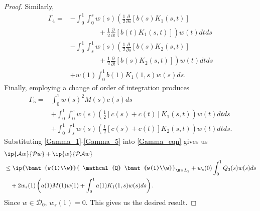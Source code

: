 \documentclass[9pt,journal,twocolumn]{IEEEtran}
\newcommand{\pfs}{\frac{\partial}{\partial s}}
\newcommand{\igzo}{\int_0^1}
\newcommand{\igzs}{\int_0^s}
\newcommand{\igso}{\int_s^1}
\newcommand{\hlf}{\frac{1}{2}}
\begin{document}
\begin{proof}
 Similarly,
 \begin{align}
 \Gamma_4 =&- \igzo \igzs w(s) \left(\hlf \pfs \left[b(s)K_1(s,t)\right] \right. \nonumber \\
 &\left. \qquad \qquad + \hlf \frac{\partial}{\partial t}\left[ b(t)K_1(s,t)\right] \right) w(t) d t ds  \nonumber \\
 & - \igzo \igso w(s) \left(\hlf \pfs \left[b(s)K_2(s,t) \right] \right. \nonumber \\
 & \left. \qquad \qquad + \hlf \frac{\partial}{\partial t} \left[b(s)K_2(s,t) \right] \right) w(t) d t ds \nonumber \\
 & \label{Gamma_4} + w(1) \igzo b(1)K_1(1,s)w(s)ds.
 \end{align} 
Finally, employing a change of order of integration produces
 \begin{align}
 \Gamma_5 = & \igzo w(s)^2 M(s) c(s) ds \nonumber \\
 &+ \igzo \igzs w(s) \left(\hlf \left[c(s)+c(t) \right] K_1(s,t) \right) w(t) d t ds \nonumber \\
 &\label{Gamma_5} + \igzo \igso w(s) \left( \hlf \left[c(s)+c(t)\right] K_2(s,t)\right)w(t) dt ds.
 \end{align}
 Substituting \eqref{Gamma_1}-\eqref{Gamma_5} into \eqref{Gamma_eqn} gives us
 \begin{align}
 &\ip{\mathcal{A}w}{\mathcal{P}w}+\ip{w}{\mathcal{P}\mathcal{A}w} \nonumber \\
 &\leq    \ip{\bmat{w(1)\\w}}{ \mathcal{Q} \bmat{w(1)\\w}}_{\R \times L_2} +w_s(0) \igzo Q_3(s)w(s)ds \nonumber \\
 &\label{eqn:primal_setup}\quad +2 w_s(1) \left( a(1)M(1)w(1)+ \igzo  a(1)K_1(1,s)w(s)ds \right) .
 \end{align} Since $w \in \mathcal{D}_0$, $w_s(1)=0$. This gives us the desired result.
 \end{proof}
\end{document}
